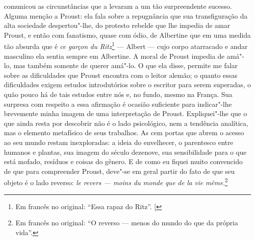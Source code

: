comunicou as circunstâncias que a levaram a um tão surpreendente
sucesso. Alguma menção a Proust: ela fala sobre a repugnância que sua
transfiguração da alta sociedade despertou"-lhe, do protesto rebelde que
lhe impedia de amar Proust, e então com fanatismo, quase com ódio, de
Albertine que em uma medida tão absurda que é \emph{ce garçon du Ritz}\footnote{Em francês no original: ``Essa rapaz do Ritz''. {[}\versal{N.~T.}{]}}
--- Albert --- cujo corpo atarracado e andar masculino ela sentia sempre
em Albertine. A moral de Proust impedia de amá"-lo, mas também somente de
querer amá"-lo. O que ela disse, permite me falar sobre as dificuldades
que Proust encontra com o leitor alemão; o quanto essas dificuldades
exigem estudos introdutórios sobre o escritor para serem superadas, o
quão pouco há de tais estudos entre nós e, no fundo, mesmo na França. Sua
surpresa com respeito a essa afirmação é ocasião suficiente para
indicar"-lhe brevemente minha imagem de uma interpretação de Proust.
Expliquei"-lhe que o que ainda resta por descobrir não é o lado
psicológico, nem a tendência analítica, mas o elemento metafísico de
seus trabalhos. As cem portas que abrem o acesso ao seu mundo restam
inexploradas: a ideia do envelhecer, o parentesco entre humanos e
plantas, sua imagem do século dezenove, sua sensibilidade para o que
está mofado, resíduos e coisas do gênero. E de como eu fiquei muito
convencido de que para compreender Proust, deve"-se em geral partir do
fato de que seu objeto é o lado reverso: \emph{le revers --- moins du
monde que de la vie même}.\footnote{Em francês no original: ``O reverso --- menos do mundo do que da própria vida''. \versal{[N.~T.]}}

